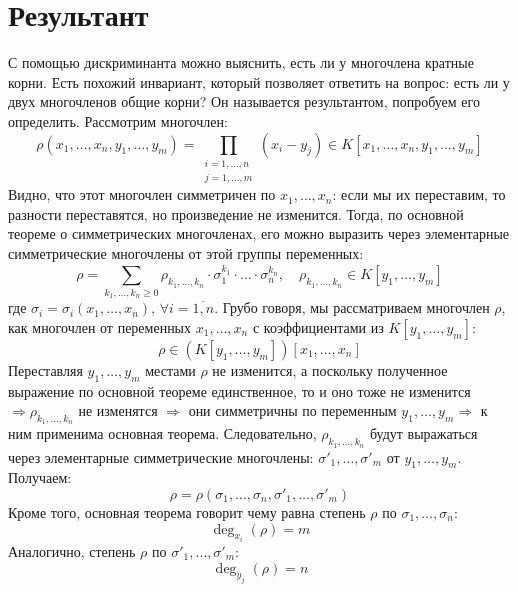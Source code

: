\documentclass[12pt]{article}
\theoremstyle{definition}
\newcommand{\ddsum}[2]{\displaystyle\sum\limits_{#1}^{#2}}
\newcommand{\ovl}[1]{\overline{#1}}
\begin{document}
\newpage
\section*{Результант}
С помощью дискриминанта можно выяснить, есть ли у многочлена кратные корни. Есть похожий инвариант, который  позволяет ответить на вопрос: есть ли у двух многочленов общие корни? Он называется результантом, попробуем его определить. Рассмотрим многочлен:
$$
	\rho(x_1,\dotsc,x_n,y_1,\dotsc,y_m) = \prod\limits_{\substack{i =1,\dotsc,n \\ j = 1,\dotsc,m}}(x_i - y_j) \in K[x_1,\dotsc,x_n,y_1,\dotsc,y_m]
$$
Видно, что этот многочлен симметричен по $x_1,\dotsc,x_n$: если мы их переставим, то разности переставятся, но произведение не изменится. Тогда, по основной теореме о симметрических многочленах, его можно выразить через элементарные симметрические многочлены от этой группы переменных: 
$$
	\rho = \ddsum{k_1,\dotsc,k_n \geq 0}{}\rho_{k_1,\dotsc,k_n}{\cdot}\sigma_1^{k_1}{\cdot}\dotsc{\cdot}\sigma_n^{k_n}, \quad \rho_{k_1,\dotsc,k_n} \in K[y_1,\dotsc,y_m]
$$
где $\sigma_i = \sigma_i(x_1,\dotsc,x_n), \, \forall i = \ovl{1,n}$. Грубо говоря, мы рассматриваем многочлен $\rho$, как многочлен от переменных $x_1,\dotsc,x_n$ с коэффициентами из $K[y_1,\dotsc,y_m]$: 
$$
	\rho \in \left(K[y_1,\dotsc,y_m]\right)[x_1,\dotsc,x_n]
$$
Переставляя $y_1,\dotsc,y_m$ местами $\rho$ не изменится, а поскольку полученное выражение по основной теореме  единственное, то и оно тоже не изменится $\Rightarrow \rho_{k_1,\dotsc,k_n}$ не изменятся $\Rightarrow$ они симметричны по переменным $y_1,\dotsc, y_m \Rightarrow$ к ним применима основная теорема. Следовательно, $\rho_{k_1,\dotsc,k_n}$ будут выражаться через элементарные симметрические многочлены: $\sigma'_1,\dotsc, \sigma'_m$ от $y_1,\dotsc,y_m$. Получаем: 
$$
	\rho = \rho(\sigma_1,\dotsc,\sigma_n,\sigma'_1,\dotsc,\sigma'_m)
$$
Кроме того, основная теорема говорит чему равна степень $\rho$ по $\sigma_1,\dotsc,\sigma_n$: 
$$
	\deg_{x_i}(\rho) = m
$$ 
Аналогично, степень $\rho$ по $\sigma'_1,\dotsc,\sigma'_m$: 
$$
	\deg_{y_j}(\rho) = n
$$
\end{document}
